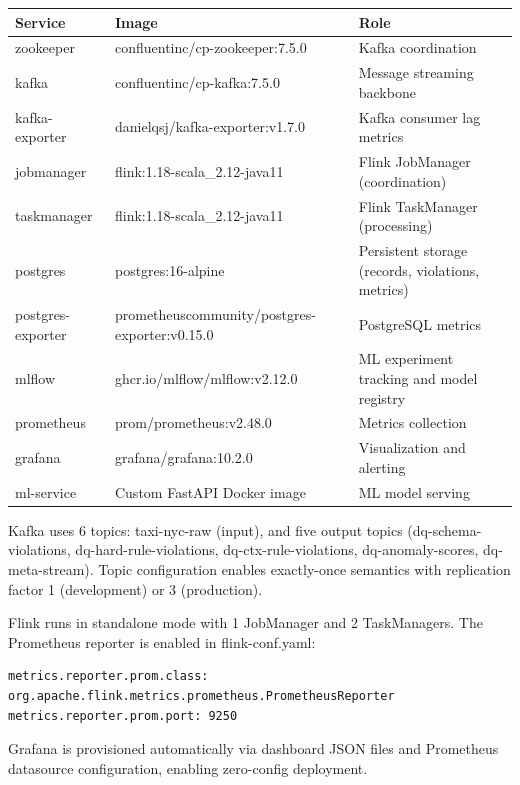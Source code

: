 \begin{longtable}{|m{3cm}|m{4cm}|m{6.5cm}|}
\hline
\textbf{Service} & \textbf{Image} & \textbf{Role} \\ \hline
zookeeper & confluentinc/cp-zookeeper:7.5.0 & Kafka coordination \\ \hline
kafka & confluentinc/cp-kafka:7.5.0 & Message streaming backbone \\ \hline
kafka-exporter & danielqsj/kafka-exporter:v1.7.0 & Kafka consumer lag metrics \\ \hline
jobmanager & flink:1.18-scala\_2.12-java11 & Flink JobManager (coordination) \\ \hline
taskmanager & flink:1.18-scala\_2.12-java11 & Flink TaskManager (processing) \\ \hline
postgres & postgres:16-alpine & Persistent storage (records, violations, metrics) \\ \hline
postgres-exporter & prometheuscommunity/postgres-exporter:v0.15.0 & PostgreSQL metrics \\ \hline
mlflow & ghcr.io/mlflow/mlflow:v2.12.0 & ML experiment tracking and model registry \\ \hline
prometheus & prom/prometheus:v2.48.0 & Metrics collection \\ \hline
grafana & grafana/grafana:10.2.0 & Visualization and alerting \\ \hline
ml-service & Custom FastAPI Docker image & ML model serving \\ \hline
\end{longtable}

Kafka uses 6 topics: taxi-nyc-raw (input), and five output topics (dq-schema-violations, dq-hard-rule-violations, dq-ctx-rule-violations, dq-anomaly-scores, dq-meta-stream). Topic configuration enables exactly-once semantics with replication factor 1 (development) or 3 (production).

Flink runs in standalone mode with 1 JobManager and 2 TaskManagers. The Prometheus reporter is enabled in flink-conf.yaml:

\begin{lstlisting}
metrics.reporter.prom.class: org.apache.flink.metrics.prometheus.PrometheusReporter
metrics.reporter.prom.port: 9250
\end{lstlisting}

Grafana is provisioned automatically via dashboard JSON files and Prometheus datasource configuration, enabling zero-config deployment.

